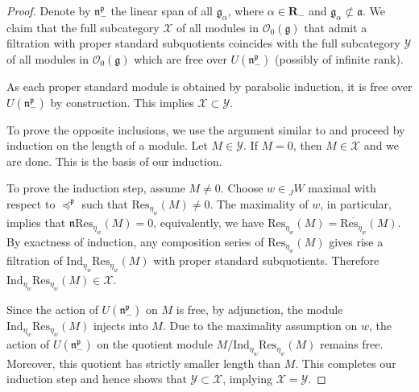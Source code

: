 \documentclass[a4paper]{amsart}
\begin{document}
\begin{proof}
Denote by $\mathfrak{n}_-^\mathfrak{p}$ the linear span of
all $\mathfrak{g}_\alpha$, where $\alpha\in\mathbf{R}_-$
and $\mathfrak{g}_\alpha\not\subset \mathfrak{a}$. We claim that
the full  subcategory $\mathcal{X}$
of all modules in $\mathcal{O}_0(\mathfrak{g})$
that admit a filtration with proper standard subquotients
coincides with the full  subcategory $\mathcal{Y}$ of all modules in 
$\mathcal{O}_0(\mathfrak{g})$ which are free over 
$U(\mathfrak{n}_-^\mathfrak{p})$ (possibly of infinite rank).

As each proper standard module is obtained by parabolic induction,
it is free over $U(\mathfrak{n}_-^\mathfrak{p})$ by construction.
This implies $\mathcal{X}\subset \mathcal{Y}$.

To prove the opposite inclusions, we use the argument similar
to \cite[Proposition~2]{BGG} and proceed by induction on 
the length of a module. Let $M\in \mathcal{Y}$.
If $M=0$, then $M\in \mathcal{X}$ and we are done.
This is the basis of our induction.

To prove the induction step, assume $M\neq 0$.
Choose $w\in {}_JW$ maximal with respect to ${\preceq^\mathfrak{p}}$
such that $\mathrm{Res}_{\eta_w}(M)\neq 0$. 
{The maximality of $w$, in particular, implies that 
$\mathfrak{n}\mathrm{Res}_{\eta_w}(M)=0$, equivalently, we have
$\mathrm{Res}_{\eta_w}(M)=\overline{\mathrm{Res}_{\eta_w}}(M)$.}
By exactness of induction, any composition series of
$\mathrm{Res}_{\eta_w}(M)$ gives rise a filtration of 
$\mathrm{Ind}_{\eta_w}\mathrm{Res}_{\eta_w}(M)$ with proper standard
subquotients. Therefore 
$\mathrm{Ind}_{\eta_w}\mathrm{Res}_{\eta_w}(M)\in \mathcal{X}$.

Since the action of $U(\mathfrak{n}_-^\mathfrak{p})$ on $M$ is free,
by adjunction, the module $\mathrm{Ind}_{\eta_w}\mathrm{Res}_{\eta_w}(M)$
injects into $M$. Due to the maximality assumption on $w$, the action of 
$U(\mathfrak{n}_-^\mathfrak{p})$ on the quotient module
$M/\mathrm{Ind}_{\eta_w}\mathrm{Res}_{\eta_w}(M)$ remains 
free. 
Moreover, this quotient has strictly smaller length than $M$.
This completes our induction step and hence shows that 
$\mathcal{Y}\subset \mathcal{X}$, implying $\mathcal{X}=\mathcal{Y}$.


\end{proof}
\end{document}
